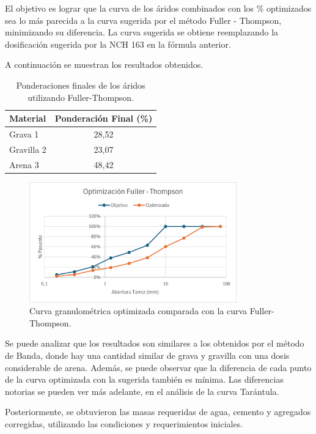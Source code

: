 El objetivo es lograr que la curva de los áridos combinados con los \% optimizados sea lo más parecida a la curva sugerida por el método Fuller - Thompson, minimizando su diferencia. La curva sugerida se obtiene reemplazando la dosificación sugerida por la NCH 163 en la fórmula anterior.  

A continuación se muestran los resultados obtenidos.

\begin{table}[H]
\centering
\caption{Ponderaciones finales de los áridos utilizando Fuller-Thompson.}
\begin{tabular}{|l|c|}
\hline
\textbf{Material} & \textbf{Ponderación Final (\%)} \\ \hline
Grava 1     & 28,52 \\ \hline
Gravilla 2  & 23,07 \\ \hline
Arena 3     & 48,42 \\ \hline
\end{tabular}
\end{table}

\begin{figure}[H]
    \centering
    \includegraphics[width=0.8\textwidth]{GRAFICOS/fuller_thompson.png}
    \caption{Curva granulométrica optimizada comparada con la curva Fuller-Thompson.}
\end{figure}

Se puede analizar que los resultados son similares a los obtenidos por el método de Banda, donde hay una cantidad similar de grava y gravilla con una dosis considerable de arena. Además, se puede observar que la diferencia de cada punto de la curva optimizada con la sugerida también es mínima. Las diferencias notorias se pueden ver más adelante, en el análisis de la curva Tarántula. 

Posteriormente, se obtuvieron las masas requeridas de agua, cemento y agregados corregidas, utilizando las condiciones y requerimientos iniciales.

